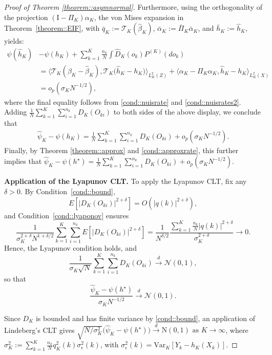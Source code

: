 \documentclass[11pt]{article}
\theoremstyle{plain}
\theoremstyle{definition}
\theoremstyle{remark}
\theoremstyle{definition}
\begin{document}
\begin{proof}[Proof of Theorem  \ref{theorem::asymnormal}]
Furthermore, using the orthogonality of the projection \( \left( \mathrm{I} - \Pi_{K} \right) \alpha_K \), the von Mises expansion in Theorem~\ref{theorem::EIF}, with \( \bar{q}_K := \mathcal{T}_{K}(\widehat{\beta}_K) \), \( \bar{\alpha}_K := \bar{\Pi}_{K} \bar{\alpha}_K \), and \( \bar{h}_K := \widehat{h}_K \), yields:
\begin{align*}
    \psi(\widehat{h}_K) &- \psi(h_K) + \sum_{k=1}^K  \frac{n_k}{N} \int  \widehat{D}_K(o_k)  P^{(K)}(do_k)   \\
    &= \big \langle \mathcal{T}_{K}(\beta_{K}  - \widehat{\beta}_K) , \mathcal{T}_{K} \big( \widehat{h}_K - h_K \big) \big \rangle_{L^2_K(Z)}   
    + \big \langle \alpha_K - \Pi_{K} \alpha_K , \widehat{h}_K - h_K \big \rangle_{L^2_K(X)} \\
    &= o_p(\sigma_K N^{-1/2}),
\end{align*}
where the final equality follows from \ref{cond::nuisrate} and \ref{cond::nuisrates2}. Adding $\frac{1}{N}   \sum_{k=1}^K \sum_{i=1}^{n_k} D_K(O_{ki})$ to both sides of the above display, we conclude that
\begin{align*}
    \widehat{\psi}_K - \psi(h_K)  = \frac{1}{N}   \sum_{k=1}^K \sum_{i=1}^{n_k} D_K(O_{ki})  + o_p(\sigma_K N^{-1/2}).
\end{align*}
Finally, by Theorem \ref{theorem::approx} and \ref{cond::approxrate}, this further implies that $ \widehat{\psi}_K - \psi(h^\star)  = \frac{1}{N}   \sum_{k=1}^K \sum_{i=1}^{n_k} D_K(O_{ki})  + o_p(\sigma_K  N^{-1/2})$.

\medskip
\noindent\textbf{Application of the Lyapunov CLT.}
To apply the Lyapunov CLT, fix any $\delta > 0$. By Condition~\ref{cond::bound},
\[
E[|D_K(O_{ki})|^{2+\delta}] = O(|q(k)|^{2+\delta}),
\]  
and Condition~\ref{cond::lyaponov} ensures
\[
\frac{1}{\sigma_K^{2 + \delta} N^{1 + \delta/2}} \sum_{k=1}^K \sum_{i=1}^{n_k} E[|D_K(O_{ki})|^{2+\delta}] 
= \frac{1}{  N^{\delta/2}} \frac{\sum_{k=1}^K \frac{n_k}{N} |q(k)|^{2+\delta}}{\sigma_K^{2 + \delta}} \to 0.
\]
Hence, the Lyapunov condition holds, and
\[
\frac{1}{\sigma_K \sqrt{N}} \sum_{k=1}^K \sum_{i=1}^{n_k} D_K(O_{ki}) \xrightarrow{d} \mathcal{N}(0,1),
\]
so that
\[
\frac{\widehat\psi_K - \psi(h^\star)}{\sigma_K N^{-1/2}} \xrightarrow{d} \mathcal{N}(0,1).
\]




Since \(D_K\) is bounded and has finite variance by \ref{cond::bound}, an application of Lindeberg's CLT gives 
\(\sqrt{N/\sigma_K^{2}} \big( \widehat{\psi}_K - \psi(h^\star) \big) \overset{d}{\to} \text{N}(0,1) \text{ as } K \to \infty\),
where  
\(\sigma_K^2 := \sum_{k=1}^K \frac{n_k}{N} q_{K}^2(k) \sigma_{\epsilon}^{2}(k)\),  
with \(\sigma_{\epsilon}^{2}(k) = \mathrm{Var}_{K}[Y_k - h_K(X_k)]\).  



\end{proof}
\end{document}
